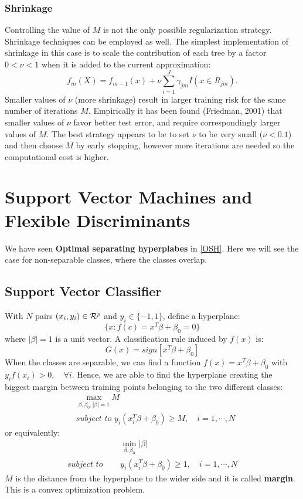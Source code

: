 \documentclass[12pt, letterpaper]{article}
\theoremstyle{definition}
\begin{document}
\subsubsection{Shrinkage}
Controlling the value of $M$ is not the only possible regularization strategy. Shrinkage techniques can be employed as well. The simplest implementation of shrinkage in this case is to scale the contribution of each tree by a factor $0<\nu<1$ when it is added to the current approximation:
\begin{equation}
f_m(X) = f_{m-1}(x) + \nu \sum_{i=1}^J \gamma_{jm}I(x \in R_{jm}).
\end{equation}
Smaller values of $\nu$ (more shrinkage) result in larger training risk for the same number of iterations $M$. Empirically it has been found (Friedman, 2001) that smaller values of $\nu$ favor better test error, and require correspondingly larger values of $M$. The best strategy appears to be to set $\nu$ to be very small ($\nu < 0.1$) and then choose $M$ by early stopping, however more iterations are needed so the computational cost is higher. 

\section{Support Vector Machines and Flexible Discriminants}
We have seen \textbf{Optimal separating hyperplabes} in \ref{OSH}. Here we will see the case for non-separable classes, where the classes overlap.
\subsection{Support Vector Classifier}
With $N$ pairs $(x_i, y_i) \in \CMcal{R}^p$ and $y_i \in \{-1, 1\}$, define a hyperplane:
\begin{equation}
\{x: f(c) = x^T\beta+ \beta_0=0\}
\end{equation}
where $\left|\beta\right|=1$ is a unit vector. A classification rule induced by $f(x)$ is:
\begin{equation}
G(x) = sign\left[x^T\beta+\beta_0\right]
\end{equation}
When the classes are separable, we can find a function $f(x)=x^T\beta+\beta_0$ with $y_if(x_i)>0, \quad \forall i$. Hence, we are able to find the hyperplane creating the biggest margin between training points belonging to the two different classes:
\begin{equation}
\begin{aligned}
&\max_{\beta, \beta_0,\left|\beta\right|=1} M\\
&\textit{subject to } y_i(x_i^T\beta+\beta_0)\ge M,\quad i=1,\cdots,N
\end{aligned}
\end{equation}
or equivalently:
\begin{equation}
\begin{aligned}
&\min_{\beta, \beta_0} \left|\beta\right|\\
\textit{subject to } \quad&y_i(x_i^T\beta+\beta_0)\ge 1,\quad i=1,\cdots,N
\end{aligned}
\end{equation}
$M$ is the distance from the hyperplane to the wider side and it is called \textbf{margin}. This is a convex optimization problem.
\end{document}
